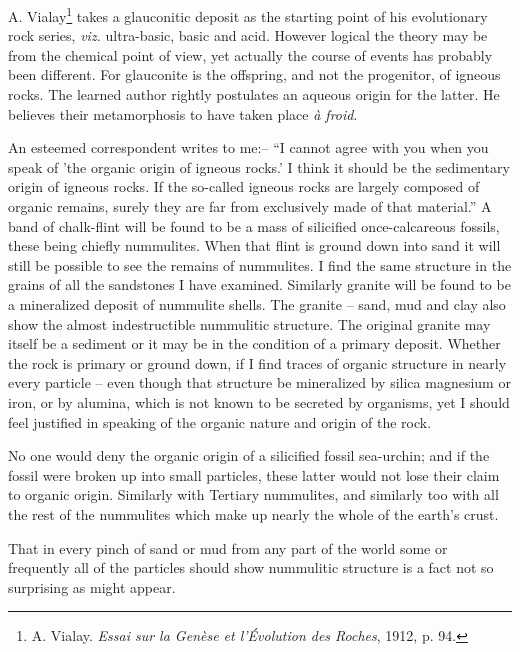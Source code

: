 \documentclass[a4paper, 12pt, oneside]{article}
\begin{document}
A. Vialay\footnote{A. Vialay. \emph{Essai sur la Genèse et l'Évolution des Roches}, 1912, p. 94.} takes a glauconitic deposit as the starting point of his evolutionary rock series, \emph{viz.} ultra-basic, basic and acid. However logical the theory may be from the chemical point of view, yet actually the course of events has probably been different. For glauconite is the offspring, and not the progenitor, of igneous rocks. The learned author rightly postulates an aqueous origin for the latter. He believes their metamorphosis to have taken place \emph{à froid}.

An esteemed correspondent writes to me:-- ``I cannot agree with you when you speak of 'the organic origin of igneous rocks.' I think it should be the sedimentary origin of igneous rocks. If the so-called igneous rocks are largely composed of organic remains, surely they are far from exclusively made of that material.'' A band of chalk-flint will be found to be a mass of silicified once-calcareous fossils, these being chiefly nummulites. When that flint is ground down into sand it will still be possible to see the remains of nummulites. I find the same structure in the grains of all the sandstones I have examined. Similarly granite will be found to be a mineralized deposit of nummulite shells. The granite -- sand, mud and clay also show the almost indestructible nummulitic structure. The original granite may itself be a sediment or it may be in the condition of a primary deposit. Whether the rock is primary or ground down, if I find traces of organic structure in nearly every particle -- even though that structure be mineralized by silica magnesium or iron, or by alumina, which is not known to be secreted by organisms, yet I should feel justified in speaking of the organic nature and origin of the rock.

No one would deny the organic origin of a silicified fossil sea-urchin; and if the fossil were broken up into small particles, these latter would not lose their claim to organic origin. Similarly with Tertiary nummulites, and similarly too with all the rest of the nummulites which make up nearly the whole of the earth's crust.

That in every pinch of sand or mud from any part of the world some or frequently all of the particles should show nummulitic structure is a fact not so surprising as might appear.
\end{document}
